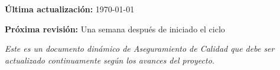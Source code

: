\documentclass[12pt,a4paper]{report}
\begin{document}
\vspace{1cm}

\textcolor{cafeOscuro}{\textbf{Última actualización:}} \today

\textcolor{cafeOscuro}{\textbf{Próxima revisión:}} Una semana después de iniciado el ciclo

\vspace{1cm}

\textit{\textcolor{grisClaro}{Este es un documento dinámico de Aseguramiento de Calidad que debe ser actualizado continuamente según los avances del proyecto.}}
\end{document}
